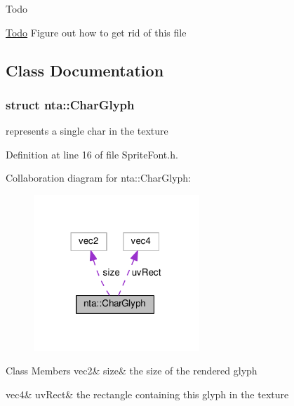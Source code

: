 \begin{DoxyRefDesc}{Todo}
\item[\hyperlink{todo__todo000006}{Todo}]Figure out how to get rid of this file \end{DoxyRefDesc}


\subsection{Class Documentation}
\label{structnta_1_1CharGlyph}
\subsubsection{struct nta\+:\+:Char\+Glyph}
represents a single char in the texture 

Definition at line 16 of file Sprite\+Font.\+h.



Collaboration diagram for nta\+:\+:Char\+Glyph\+:\nopagebreak
\begin{figure}[H]
\begin{center}
\leavevmode
\includegraphics[width=177pt]{df/ddc/structnta_1_1CharGlyph__coll__graph}
\end{center}
\end{figure}
\begin{DoxyFields}{Class Members}
\mbox{\label{namespacenta_aa2a40e6fe48ffadb4c7c95af7e82db91}} 
vec2&
size&
the size of the rendered glyph \\
\hline

\mbox{\label{namespacenta_a46d9ea9c38c8bf5e1c1679e938019f53}} 
vec4&
uvRect&
the rectangle containing this glyph in the texture \\
\hline

\end{DoxyFields}
\label{structnta_1_1GLTexture}
